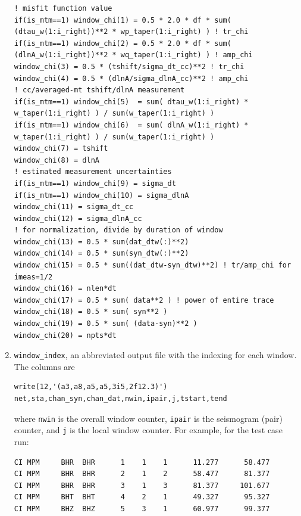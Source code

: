 \documentclass[11pt,titlepage,fleqn]{article}
\begin{document}
\begin{enumerate}
\begin{verbatim}
! misfit function value
if(is_mtm==1) window_chi(1) = 0.5 * 2.0 * df * sum( (dtau_w(1:i_right))**2 * wp_taper(1:i_right) ) ! tr_chi
if(is_mtm==1) window_chi(2) = 0.5 * 2.0 * df * sum( (dlnA_w(1:i_right))**2 * wq_taper(1:i_right) ) ! amp_chi
window_chi(3) = 0.5 * (tshift/sigma_dt_cc)**2 ! tr_chi
window_chi(4) = 0.5 * (dlnA/sigma_dlnA_cc)**2 ! amp_chi
! cc/averaged-mt tshift/dlnA measurement
if(is_mtm==1) window_chi(5)  = sum( dtau_w(1:i_right) * w_taper(1:i_right) ) / sum(w_taper(1:i_right) )
if(is_mtm==1) window_chi(6)  = sum( dlnA_w(1:i_right) * w_taper(1:i_right) ) / sum(w_taper(1:i_right) )
window_chi(7) = tshift
window_chi(8) = dlnA
! estimated measurement uncertainties
if(is_mtm==1) window_chi(9) = sigma_dt
if(is_mtm==1) window_chi(10) = sigma_dlnA
window_chi(11) = sigma_dt_cc
window_chi(12) = sigma_dlnA_cc
! for normalization, divide by duration of window
window_chi(13) = 0.5 * sum(dat_dtw(:)**2)
window_chi(14) = 0.5 * sum(syn_dtw(:)**2)
window_chi(15) = 0.5 * sum((dat_dtw-syn_dtw)**2) ! tr/amp_chi for imeas=1/2
window_chi(16) = nlen*dt
window_chi(17) = 0.5 * sum( data**2 ) ! power of entire trace
window_chi(18) = 0.5 * sum( syn**2 )
window_chi(19) = 0.5 * sum( (data-syn)**2 )
window_chi(20) = npts*dt
\end{verbatim}
\item \verb+window_index+, an abbreviated output file with the indexing for each window. The columns are 
\begin{verbatim}
write(12,'(a3,a8,a5,a5,3i5,2f12.3)') net,sta,chan_syn,chan_dat,nwin,ipair,j,tstart,tend
\end{verbatim}
where \verb+nwin+ is the overall window counter, \verb+ipair+ is the seismogram (pair) counter, and \verb+j+ is the local window counter. For example, for the test case run:
%
\begin{verbatim}
CI MPM     BHR  BHR      1    1    1      11.277      58.477
CI MPM     BHR  BHR      2    1    2      58.477      81.377
CI MPM     BHR  BHR      3    1    3      81.377     101.677
CI MPM     BHT  BHT      4    2    1      49.327      95.327
CI MPM     BHZ  BHZ      5    3    1      60.977      99.377
\end{verbatim}
%
\end{enumerate}
\end{document}
